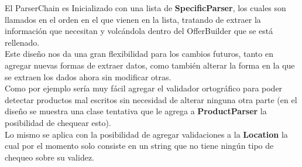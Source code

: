 \documentclass[10pt, a4paper]{article}
\begin{document}
El ParserChain es Inicializado con una lista de \textbf{SpecificParser}, los cuales son llamados en el orden en el que vienen en la lista, tratando de extraer la información que necesitan y volcándola dentro del OfferBuilder que se está rellenado.\\

Este diseño nos da una gran flexibilidad para los cambios futuros, tanto en agregar nuevas formas de extraer datos, como también alterar la forma en la que se extraen los dados ahora sin modificar otras.\\

Como por ejemplo sería muy fácil agregar el validador ortográfico para poder detectar productos mal escritos sin necesidad de alterar ninguna otra parte (en el diseño se muestra una clase tentativa que le agrega a \textbf{ProductParser} la posibilidad de chequear esto).\\

Lo mismo se aplica con la posibilidad de agregar validaciones a la \textbf{Location} la cual por el momento solo consiste en un string que no tiene ningún tipo de chequeo sobre su validez.\\ 
\end{document}
